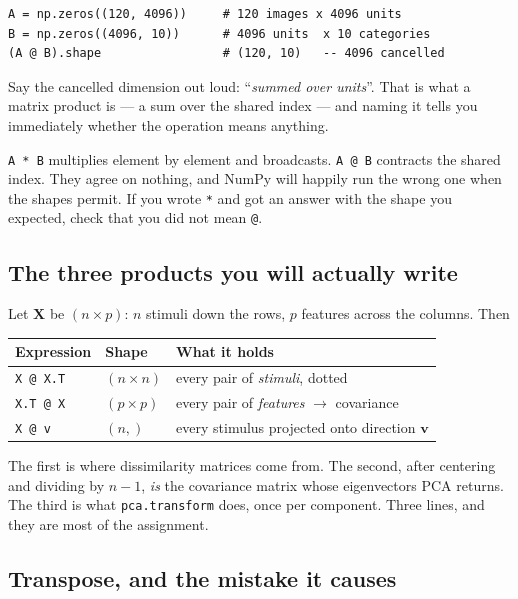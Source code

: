\documentclass[11pt]{article}
\begin{document}
\begin{lstlisting}
A = np.zeros((120, 4096))     # 120 images x 4096 units
B = np.zeros((4096, 10))      # 4096 units  x 10 categories
(A @ B).shape                 # (120, 10)   -- 4096 cancelled
\end{lstlisting}

Say the cancelled dimension out loud: ``\emph{summed over units}''. That is what
a matrix product is --- a sum over the shared index --- and naming it tells you
immediately whether the operation means anything.

\begin{keybox}
 \texttt{A * B} multiplies element by element
and broadcasts. \texttt{A @ B} contracts the shared index. They agree on
nothing, and NumPy will happily run the wrong one when the shapes permit. If you
wrote \texttt{*} and got an answer with the shape you expected, check that you
did not mean \texttt{@}.
\end{keybox}

\subsection{The three products you will actually write}

Let $\boldsymbol{X}$ be $(n \times p)$: $n$ stimuli down the rows, $p$ features
across the columns. Then

\begin{center}
\begin{tabular}{@{}lll@{}}
\toprule
Expression & Shape & What it holds \\
\midrule
\texttt{X @ X.T} & $(n \times n)$ & every pair of \emph{stimuli}, dotted \\
\texttt{X.T @ X} & $(p \times p)$ & every pair of \emph{features} $\rightarrow$ covariance \\
\texttt{X @ v}   & $(n,)$         & every stimulus projected onto direction $\boldsymbol{v}$ \\
\bottomrule
\end{tabular}
\end{center}

The first is where dissimilarity matrices come from. The second, after
centering and dividing by $n-1$, \emph{is} the covariance matrix whose
eigenvectors PCA returns. The third is what \texttt{pca.transform} does, once
per component. Three lines, and they are most of the assignment.

\subsection{Transpose, and the mistake it causes}
\end{document}
